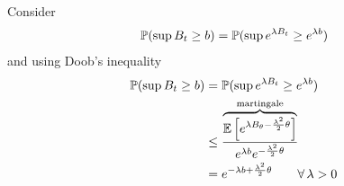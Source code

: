\documentclass{report}
\begin{document}
\begin{example}
	\begin{fancyproof}
		Consider
		\begin{equation*}
			\mathbb{P}(\sup B_{t}\geq b)=\mathbb{P}(\sup e^{\lambda B_{t}}\geq e^{\lambda b})
		\end{equation*}
		and using Doob's inequality
		\begin{align*}
			\mathbb{P}(\sup B_{t}\geq b)&=\mathbb{P}(\sup e^{\lambda B_{t}}\geq e^{\lambda b})\\
			&\leq \frac{\overbrace{\mathbb{E}\left[e^{\lambda B_{\theta}-\frac{\lambda^{2}}{2}\theta}\right]}^{\text{martingale}}}{e^{\lambda b}e^{-\frac{\lambda^{2}}{2}\theta}}\\
			&=e^{-\lambda b+\frac{\lambda^{2}}{2}\theta}\qquad\forall\,\lambda>0
		\end{align*}
	\end{fancyproof}
\end{example}
\end{document}
